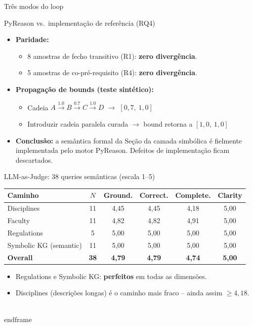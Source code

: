 \documentclass[aspectratio=169]{beamer}
\begin{document}
\begin{frame}{Três modos do loop}
\begin{frame}{PyReason vs.\ implementação de referência (RQ4)}
  \begin{itemize}
    \item \textbf{Paridade:}
      \begin{itemize}
        \item 8 amostras de fecho transitivo (R1): \textbf{zero divergência}.
        \item 5 amostras de co-pré-requisito (R4): \textbf{zero divergência}.
      \end{itemize}
    \vspace{0.5em}
    \item \textbf{Propagação de bounds (teste sintético):}
      \begin{itemize}
        \item Cadeia $A \xrightarrow{1.0} B \xrightarrow{0.7} C \xrightarrow{1.0} D$ $\to$ $[0{,}7,\ 1{,}0]$ \checkmark
        \item Introduzir cadeia paralela curada $\to$ bound retorna a $[1{,}0,\ 1{,}0]$ \checkmark
      \end{itemize}
    \vspace{0.5em}
    \item \textbf{Conclusão:} a semântica formal da Seção da camada simbólica é fielmente implementada pelo motor PyReason. Defeitos de implementação ficam descartados.
  \end{itemize}
\end{frame}

\begin{frame}{LLM-as-Judge: 38 queries semânticas (escala 1--5)}
  \begin{table}\centering\small
    \begin{tabular}{lccccc}
      \toprule
      \textbf{Caminho} & \textbf{$N$} & \textbf{Ground.} & \textbf{Correct.} & \textbf{Complete.} & \textbf{Clarity} \\
      \midrule
      Disciplines              & 11 & 4,45 & 4,45 & 4,18 & 5,00 \\
      Faculty                  & 11 & 4,82 & 4,82 & 4,91 & 5,00 \\
      Regulations              & 5  & 5,00 & 5,00 & 5,00 & 5,00 \\
      Symbolic KG (semantic)   & 11 & 5,00 & 5,00 & 5,00 & 5,00 \\
      \midrule
      \textbf{Overall}         & \textbf{38} & \textbf{4,79} & \textbf{4,79} & \textbf{4,74} & \textbf{5,00} \\
      \bottomrule
    \end{tabular}
  \end{table}
  \vspace{0.5em}
  \begin{itemize}\small
    \item Regulations e Symbolic KG: \textbf{perfeitos} em todas as dimensões.
    \item Disciplines (descrições longas) é o caminho mais fraco -- ainda assim $\geq 4{,}18$.
  \end{itemize}
\\end{frame}


\end{frame}
\end{frame}
\end{document}
